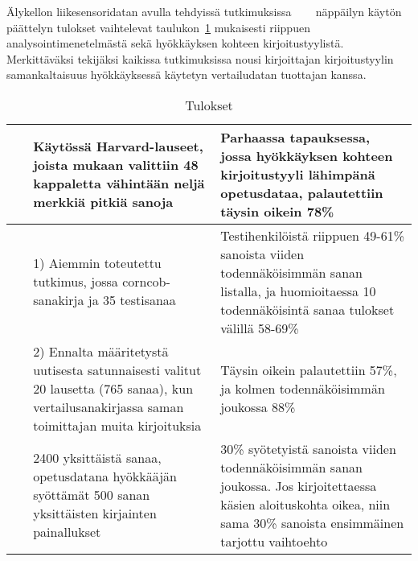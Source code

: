 \documentclass[finnish]{tktltiki2}
\theoremstyle{definition}
\theoremstyle{remark}
\begin{document}
Älykellon liikesensoridatan avulla tehdyissä tutkimuksissa~\cite{maiti} ~\cite{liu}~\cite{mole} näppäilyn käytön päättelyn tulokset vaihtelevat taulukon~\ref{t:2} mukaisesti riippuen analysointimenetelmästä sekä hyökkäyksen kohteen kirjoitustyylistä. Merkittäväksi tekijäksi kaikissa tutkimuksissa nousi kirjoittajan kirjoitustyylin samankaltaisuus hyökkäyksessä käytetyn vertailudatan tuottajan kanssa.
\linebreak

\begin{table} [h]
    \begin{tabular}{ | l | p{55mm} | p{55mm} | }
    \toprule
      ~\cite{maiti} & Käytössä Harvard-lauseet, joista mukaan valittiin 48 kappaletta vähintään neljä merkkiä pitkiä sanoja  & Parhaassa tapauksessa, jossa hyökkäyksen kohteen kirjoitustyyli lähimpänä opetusdataa, palautettiin täysin oikein 78\%  \\
      \midrule
      ~\cite{liu} & 1) Aiemmin toteutettu tutkimus, jossa corncob-sanakirja ja 35 testisanaa  & Testihenkilöistä riippuen 49-61\% sanoista viiden todennäköisimmän sanan listalla, ja huomioitaessa 10 todennäköisintä sanaa tulokset välillä 58-69\%  \\
      \arrayrulecolor{lightgray}
      \midrule
      & 2) Ennalta määritetystä uutisesta satunnaisesti valitut 20 lausetta (765 sanaa), kun vertailusanakirjassa saman toimittajan muita kirjoituksia & Täysin oikein palautettiin 57\%, ja kolmen todennäköisimmän joukossa 88\% \\
      \arrayrulecolor{black}
      \midrule
      ~\cite{mole} & 2400 yksittäistä sanaa, opetusdatana hyökkääjän syöttämät 500 sanan yksittäisten kirjainten painallukset & 30\%  syötetyistä sanoista viiden todennäköisimmän sanan joukossa. Jos kirjoitettaessa käsien aloituskohta oikea, niin sama 30\% sanoista ensimmäinen tarjottu vaihtoehto \\
      \bottomrule
    \end{tabular}
    \caption{Tulokset}\label{t:2}
\end{table}
    
\end{document}
